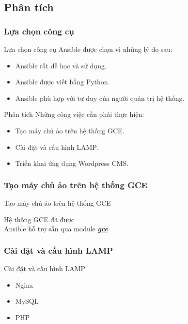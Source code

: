\documentclass[14pt]{beamer}
\begin{document}
\subsection{Phân tích}
\subsubsection*{Lựa chọn công cụ}
\begin{frame}{Lựa chọn công cụ}
\renewcommand{\baselinestretch}{1.50}\normalsize
Ansible được chọn vì những lý do sau:
\begin{itemize}
\item Ansible rất dễ học và sử dụng.
\item Ansible được viết bằng Python.
\item Ansible phù hợp với tư duy của người quản trị hệ thống.
\renewcommand{\baselinestretch}{1.0}\normalsize
\end{itemize}
\end{frame}


\begin{frame}{Phân tích}
\renewcommand{\baselinestretch}{1.50}\normalsize
Những công việc cần phải thực hiện:
\begin{itemize}
\item Tạo máy chủ ảo trên hệ thống GCE.
\item Cài đặt và cấu hình LAMP.
\item Triển khai ứng dụng Wordpress CMS.
\end{itemize}
\renewcommand{\baselinestretch}{1.0}\normalsize
\end{frame}

\subsubsection*{Tạo máy chủ ảo trên hệ thống GCE}
\begin{frame}{Tạo máy chủ ảo trên hệ thống GCE}
\begin{center}
\Large Hệ thống GCE đã được \\
Ansible hỗ trợ sẵn qua module \href{http://www.ansibleworks.com/docs/modules.html\#gce}{\textbf{\textit{gce}}}
\end{center}
\end{frame}

\subsubsection*{Cài đặt và cấu hình LAMP}
\begin{frame}{Cài đặt và cấu hình LAMP}
\begin{itemize}
\item \Large Nginx
\item \Large MySQL
\item \Large PHP
\end{itemize}
\end{frame}
\end{document}
